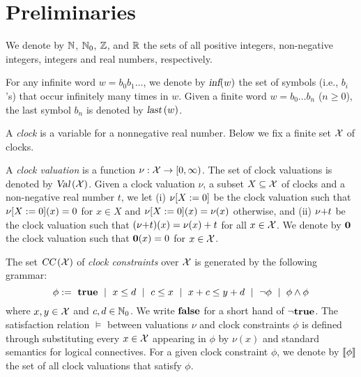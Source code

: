 \section{Preliminaries}

We denote by $\mathbb{N}$, $\mathbb{N}_0$, $\mathbb{Z}$, and $\mathbb{R}$ the sets of all positive
integers, non-negative integers, integers and real numbers, respectively.

For any infinite word $w=b_0b_1\dots$, we denote by $\mbox{\sl inf} ( w )$ the set of symbols (i.e., $b_i$'s) that occur infinitely many times in $w$.
Given a finite word $w=b_0\dots b_n$ ($n\ge 0$), the last symbol $b_n$ is denoted by $\mbox{\sl last}\left(w\right)$.

%
%
A \emph{clock} is a variable for a nonnegative real number. Below we fix a finite set $\mathcal{X}$ of clocks.

\smallskip {}
A \emph{clock valuation} is a function $\nu:\mathcal{X}\rightarrow [0,\infty)$. The set of clock valuations
is denoted by $\mbox{\sl Val}\left(\mathcal{X}\right)$.
Given a clock valuation $\nu$, a subset $X\subseteq\mathcal{X}$ of clocks and a non-negative real number $t$, we let (i) ${\nu}{\left[X:=0\right]}$ be the clock valuation such that ${\nu}{\left[X:=0\right]}(x)=0$ for $x\in X$ and ${\nu}{\left[X:=0\right]}(x)=\nu(x)$ otherwise, and (ii) ${\nu}{+}{t}$ be the clock valuation such that $({\nu}{+}{t})(x)=\nu(x)+t$ for all $x\in\mathcal{X}$.
We denote by $\mathbf{0}$ the clock valuation such that $\mathbf{0}(x)=0$ for $x\in\mathcal{X}$.

\smallskip {} The set $\mbox{\sl CC}\left(\mathcal{X}\right)$ of \emph{clock constraints}  over $\mathcal{X}$ is generated by the following grammar:
\[
\phi:=~\mathbf{true}~\mid~x\le d~\mid ~c\le x~\mid~x+c\le y+d~\mid ~\neg\phi~\mid~\phi\wedge\phi
\]
where $x,y\in\mathcal{X}$ and $c,d\in\mathbb{N}_0$.
We write $\mathbf{false}$ for a short hand of $\neg\mathbf{true}$.
The satisfaction relation $\models$ between valuations $\nu$ and clock constraints $\phi$ is defined through substituting every $x\in\mathcal{X}$ appearing in $\phi$ by $\nu(x)$ and standard semantics for logical connectives.
For a given clock constraint $\phi$, we denote by ${\llbracket}{\phi}{\rrbracket}$ the set of all clock valuations that satisfy $\phi$.


